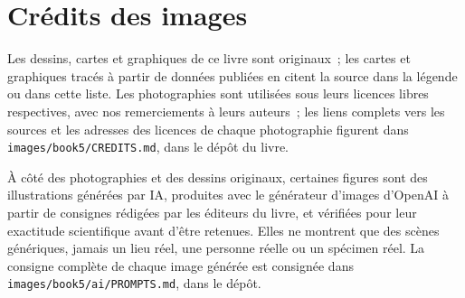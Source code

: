\chapter*{Crédits des images}

Les dessins, cartes et graphiques de ce livre sont originaux~; les cartes
et graphiques tracés à partir de données publiées en citent la source dans
la légende ou dans cette liste. Les photographies sont utilisées sous leurs
licences libres respectives, avec nos remerciements à leurs auteurs~; les
liens complets vers les sources et les adresses des licences de chaque
photographie figurent dans \texttt{images/book5/CREDITS.md}, dans le dépôt
du livre.

\bigskip
À côté des photographies et des dessins originaux, certaines figures sont
des illustrations générées par IA, produites avec le générateur d'images
d'OpenAI à partir de consignes rédigées par les éditeurs du livre, et
vérifiées pour leur exactitude scientifique avant d'être retenues. Elles
ne montrent que des scènes génériques, jamais un lieu réel, une personne
réelle ou un spécimen réel. La consigne complète de chaque image générée
est consignée dans \texttt{images/book5/ai/PROMPTS.md}, dans le dépôt.

